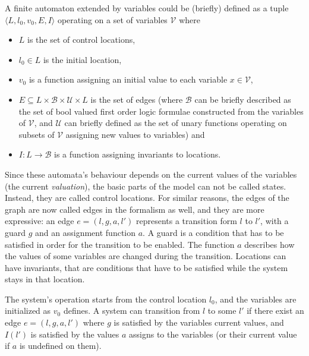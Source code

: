\begin{dfn}
A finite automaton extended by variables could be (briefly) defined as a tuple $\langle L,l_0,v_0, E, I\rangle$ operating on a set of variables $\mathcal{V}$ where
\begin{itemize}
	\item $L$ is the set of control locations,
	\item $l_0 \in L$ is the initial location,
	\item $v_0$ is a function assigning an initial value to each variable $x \in \mathcal{V}$,
	\item $E \subseteq L \times \mathcal{B} \times \mathcal{U} \times L$ is the set of edges (where $\mathcal{B}$ can be briefly described as the set of bool valued first order logic formulae constructed from the variables of $\mathcal{V}$,  and $\mathcal{U}$ can briefly defined as the set of unary functions operating on subsets of $\mathcal{V}$  assigning new values to variables) and
	\item $I: L \to \mathcal{B}$ is a function assigning invariants to locations.
\end{itemize}
\end{dfn}

Since these automata's behaviour depends on the current values of the variables (the  current \emph{valuation}), the basic parts of the model can not be called states.
Instead, they are called control locations. For similar reasons, the edges of the graph are now called edges in the formalism as well, and they are more expressive: an edge $e=(l,g,a,l')$ represents a transition form $l$ to $l'$, with a guard $g$ and an assignment function $a$. A guard is a condition that has to be satisfied in order for the transition to be enabled. The function $a$ describes how the values of some variables are changed during the transition. Locations can have invariants, that are conditions that have to be satisfied while the system stays in that location.

The system's operation starts from the control location $l_0$, and the variables are initialized as $v_0$ defines. A system can transition from $l$ to some $l'$ if there exist an edge $e=(l,g,a,l')$ where $g$ is satisfied by the variables current values, and $I(l')$ is satisfied by the values $a$ assigns to the variables (or their current value if $a$ is undefined on them).


